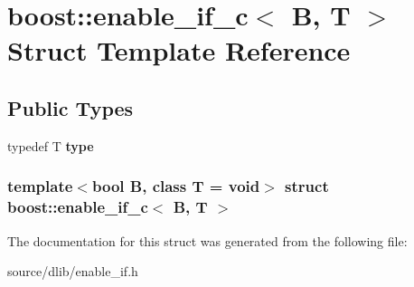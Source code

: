 \hypertarget{structboost_1_1enable__if__c}{
\section{boost::enable\_\-if\_\-c$<$ B, T $>$ Struct Template Reference}
\label{structboost_1_1enable__if__c}
}
\subsection*{Public Types}
\begin{DoxyCompactItemize}
\item 
\hypertarget{structboost_1_1enable__if__c_ad0c840d6d2f1cccff0f54ec4e577cd84}{
typedef T {\bfseries type}}
\label{structboost_1_1enable__if__c_ad0c840d6d2f1cccff0f54ec4e577cd84}

\end{DoxyCompactItemize}
\subsubsection*{template$<$bool B, class T = void$>$ struct boost::enable\_\-if\_\-c$<$ B, T $>$}



The documentation for this struct was generated from the following file:\begin{DoxyCompactItemize}
\item 
source/dlib/enable\_\-if.h\end{DoxyCompactItemize}
